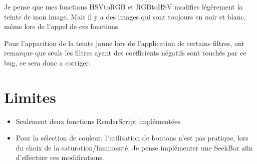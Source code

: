 \documentclass{article}
\begin{document}
\medbreak
Je pense que mes fonctions HSVtoRGB et RGBtoHSV modifies légèrement la teinte de mon image. Mais il y a des images qui sont toujours en noir et blanc, même lors de l'appel de ces fonctions.

Pour l'apparition de la teinte jaune lors de l'application de certains filtres, ont remarque que seuls les filtres ayant des coefficients négatifs sont touchés par ce bug, ce sera donc a corriger.

\section{Limites}
\begin{itemize}
    \item Seulement deux fonctions RenderScript implémentées.
    \item Pour la sélection de couleur, l'utilisation de boutons n'est pas pratique, lors du choix de la saturation/luminosité. Je pense implémenter une SeekBar afin d'effectuer ces modifications.
\end{itemize}
\end{document}
